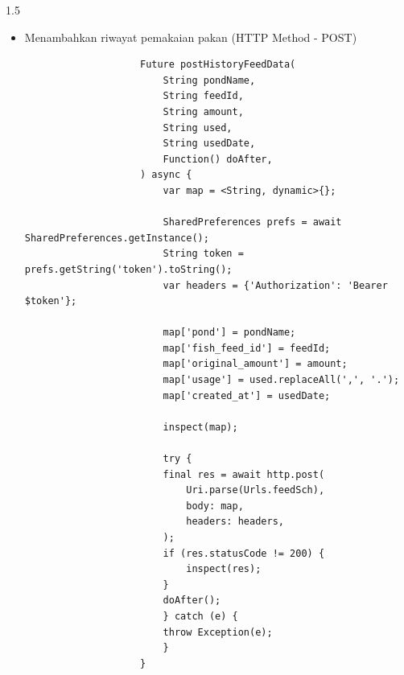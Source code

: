 \begin{spacing}{1.5}
\begin{enumerate}
\begin{enumerate}
\begin{itemize}
				\begin{lstlisting}
					Future getHistoryFeedData(bool isReversed, String firstDate, String lastDate,
						Function() doAfter) async {
						feedHistoryList.value.data!.clear();
						isLoadingHistory.value = true;

						SharedPreferences prefs = await SharedPreferences.getInstance();
						String token = prefs.getString('token').toString();
						var headers = {'Authorization': 'Bearer $token'};

						final response = await http.get(
							Uri.parse('${Urls.feedSch}?start_date=$firstDate&end_date=$lastDate'),
							headers: headers);

						try {
						if (response.statusCode == 200) {
							HistoryFeedModel res =
								HistoryFeedModel.fromJson(jsonDecode(response.body));

							if (isReversed) {
							var temp = res;
							feedHistoryList.value.data = temp.data!.reversed.toList();
							} else {
							var temp = res;
							feedHistoryList.value.data = temp.data!;
							}

							doAfter();
						}
						} catch (e) {
						throw Exception(e);
						}
						isLoadingHistory.value = false;
					}
				\end{lstlisting}

				\item Menambahkan riwayat pemakaian pakan (HTTP Method - POST)
				
				\begin{lstlisting}
					Future postHistoryFeedData(
						String pondName,
						String feedId,
						String amount,
						String used,
						String usedDate,
						Function() doAfter,
					) async {
						var map = <String, dynamic>{};

						SharedPreferences prefs = await SharedPreferences.getInstance();
						String token = prefs.getString('token').toString();
						var headers = {'Authorization': 'Bearer $token'};

						map['pond'] = pondName;
						map['fish_feed_id'] = feedId;
						map['original_amount'] = amount;
						map['usage'] = used.replaceAll(',', '.');
						map['created_at'] = usedDate;

						inspect(map);

						try {
						final res = await http.post(
							Uri.parse(Urls.feedSch),
							body: map,
							headers: headers,
						);
						if (res.statusCode != 200) {
							inspect(res);
						}
						doAfter();
						} catch (e) {
						throw Exception(e);
						}
					}
				\end{lstlisting}


\end{itemize}
\end{enumerate}
\end{enumerate}
\end{spacing}
